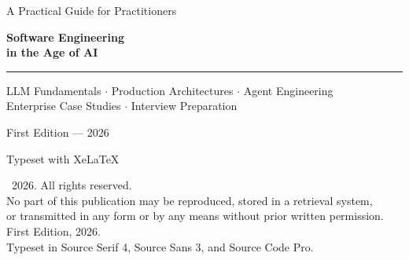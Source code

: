 \thispagestyle{empty}

\begin{center}
\vspace*{3cm}

{\sffamily\fontsize{14}{18}\selectfont\color{oreillygray}
A Practical Guide for Practitioners}

\vspace{1.5cm}

{\sffamily\bfseries\fontsize{36}{42}\selectfont\color{oreillydark}
Software Engineering\\[0.3cm]
in the Age of AI}

\vspace{0.8cm}

{\color{oreillyteal}\rule{0.4\textwidth}{3pt}}

\vspace{1.5cm}

{\sffamily\fontsize{14}{18}\selectfont\color{oreillygray}
LLM Fundamentals $\cdot$ Production Architectures $\cdot$ Agent Engineering\\[0.3cm]
Enterprise Case Studies $\cdot$ Interview Preparation}

\vspace{3cm}

{\sffamily\Large\color{oreillydark}
First Edition --- 2026}

\vfill

{\sffamily\small\color{oreillygray}
Typeset with XeLaTeX}

\end{center}

\clearpage
\thispagestyle{empty}

\vspace*{\fill}
\begin{center}
{\small\color{oreillygray}
\textcopyright\ 2026. All rights reserved.\\[0.5em]
No part of this publication may be reproduced, stored in a retrieval system,\\
or transmitted in any form or by any means without prior written permission.\\[1em]
First Edition, 2026.\\[0.5em]
Typeset in Source Serif 4, Source Sans 3, and Source Code Pro.
}
\end{center}
\vspace{1cm}
